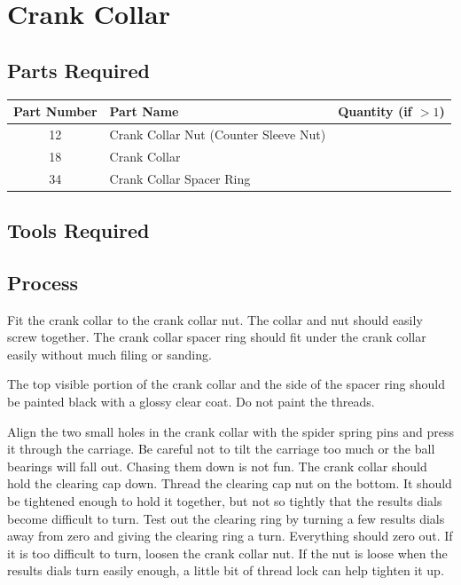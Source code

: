\documentclass[openany]{book}
\begin{document}
\chapter{Crank Collar}
\section{Parts Required}
\begin{table}[!ht]
	\centering
	\begin{tabular}{clc}
		Part Number & Part Name & Quantity (if $>1$) \\ \hline
		 12 & Crank Collar Nut (Counter Sleeve Nut) & \\
		 18 & Crank Collar & \\
		 34 & Crank Collar Spacer Ring &\\
	\end{tabular}
\end{table}


\section{Tools Required}

\section{Process}
Fit the crank collar to the crank collar nut. The collar and nut should easily screw together. The crank collar spacer ring should fit under the crank collar easily without much filing or sanding.

The top visible portion of the crank collar and the side of the spacer ring should be painted black with a glossy clear coat. Do not paint the threads.

Align the two small holes in the crank collar with the spider spring pins and press it through the carriage. Be careful not to tilt the carriage too much or the ball bearings will fall out. Chasing them down is not fun. The crank collar should hold the clearing cap down. Thread the clearing cap nut on the bottom. It should be tightened enough to hold it together, but not so tightly that the results dials become difficult to turn. Test out the clearing ring by turning a few results dials away from zero and giving the clearing ring a turn. Everything should zero out. If it is too difficult to turn, loosen the crank collar nut. If the nut is loose when the results dials turn easily enough, a little bit of thread lock can help tighten it up.
\end{document}
